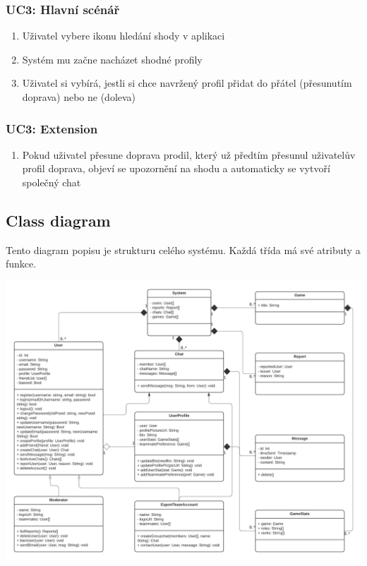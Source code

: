 \documentclass[czech,12pt,a4paper,titlepage]{article}
\begin{document}
\subsubsection{UC3: Hlavní scénář}

\begin{enumerate}
    \item Uživatel vybere ikonu hledání shody v aplikaci
    \item Systém mu začne nacházet shodné profily
    \item Uživatel si vybírá, jestli si chce navržený profil přidat do
          přátel (přesunutím doprava) nebo ne (doleva)
\end{enumerate}

\subsubsection{UC3: Extension}

\begin{enumerate}
    \item Pokud uživatel přesune doprava prodil, který už předtím
          přesunul uživatelův profil doprava, objeví se upozornění na shodu
          a automaticky se vytvoří společný chat
\end{enumerate}

\clearpage

\subsection{Class diagram}

Tento diagram popisu je strukturu celého systému. Každá třída má své atributy a funkce.

\bigskip
\bigskip
\bigskip
\bigskip
\bigskip
\bigskip


\includegraphics[width=1\textwidth, center]{Class_diagram.png}
\end{document}
